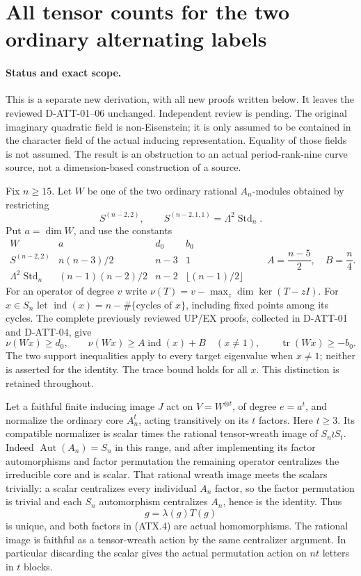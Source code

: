 \section{All tensor counts for the two ordinary alternating labels}
\label{sec:alternating-two-tail-all-tensors}

\paragraph{Status and exact scope.}
This is a separate new derivation, with all new proofs written below.
It leaves the reviewed D-ATT-01--06 unchanged.  Independent review is
pending.  The original imaginary quadratic field is non-Eisenstein;
it is only assumed to be contained in the character field of the
actual inducing representation.  Equality of those fields is not
assumed.  The result is an obstruction to an actual period-rank-nine
curve source, not a dimension-based construction of a source.

Fix $n\ge15$.  Let $W$ be one of the two ordinary rational
$A_n$-modules obtained by restricting
\[
 S^{(n-2,2)},\qquad S^{(n-2,1,1)}=\Lambda^2\operatorname{Std}_n.
 \tag{ATX.1}
\]
Put $a=\dim W$, and use the constants
\[
\begin{array}{c|c|c|c}
 W&a&d_0&b_0\\ \hline
 S^{(n-2,2)}&n(n-3)/2&n-3&1\\
 \Lambda^2\operatorname{Std}_n&(n-1)(n-2)/2&n-2&\lfloor(n-1)/2\rfloor
\end{array}
\qquad A=\frac{n-5}{2},\quad B=\frac n4.
\tag{ATX.2}
\]
For an operator of degree $v$ write
$\nu(T)=v-\max_z\dim\ker(T-zI)$.  For $x\in S_n$ let
$\operatorname{ind}(x)=n-\#\{\text{cycles of }x\}$, including fixed
points among its cycles.  The complete previously reviewed UP/EX
proofs, collected in D-ATT-01 and D-ATT-04, give
\[
 \nu(Wx)\ge d_0,\qquad
 \nu(Wx)\ge A\operatorname{ind}(x)+B\quad(x\ne1),
 \qquad \operatorname{tr}(Wx)\ge-b_0.
 \tag{ATX.3}
\]
The two support inequalities apply to every target eigenvalue
when $x\ne1$; neither is asserted for the identity.  The trace
bound holds for all $x$.  This distinction is retained throughout.

Let a faithful finite inducing image $J$ act on
$V=W^{\otimes t}$, of degree $e=a^t$, and normalize the ordinary
core $A_n^t$, acting transitively on its $t$ factors.  Here $t\ge3$.
Its compatible normalizer is scalar times the rational tensor-wreath
image of $S_n\wr S_t$.  Indeed $\operatorname{Aut}(A_n)=S_n$ in
this range, and after implementing its factor automorphisms and
factor permutation the remaining operator centralizes the irreducible
core and is scalar.  That rational wreath image meets the scalars
trivially: a scalar centralizes every individual $A_n$ factor, so the
factor permutation is trivial and each $S_n$ automorphism centralizes
$A_n$, hence is the identity.  Thus
\[
                  g=\lambda(g)T(g)
 \tag{ATX.4}
\]
is unique, and both factors in (ATX.4) are actual homomorphisms.
The rational image is faithful as a tensor-wreath action by the
same centralizer argument.  In particular discarding the scalar
gives the actual permutation action on $nt$ letters in $t$ blocks.

